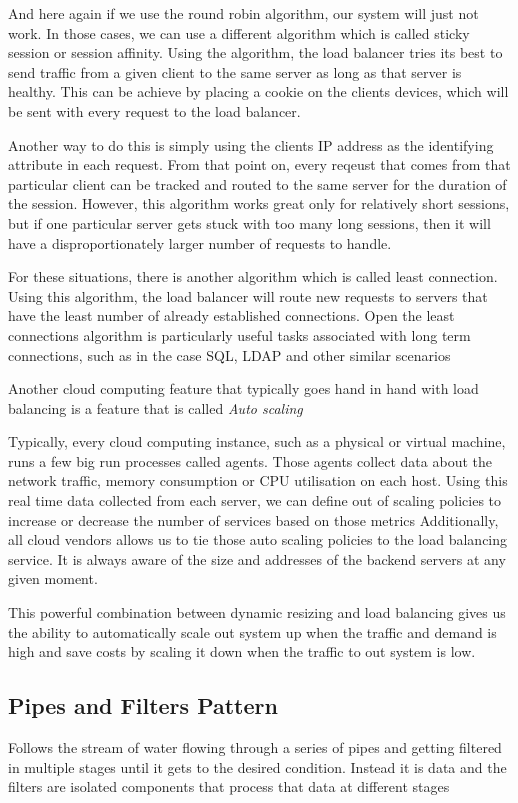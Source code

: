 And here again if we use the round robin algorithm, our system will just not work.
In those cases, we can use a different algorithm which is called sticky session or session affinity.
Using the algorithm, the load balancer tries its best to send traffic from a given client to the same server as long as that server is healthy.
This can be achieve by placing a cookie on the clients devices, which will be sent with every request to the load balancer.

Another way to do this is simply using the clients IP address as the identifying attribute in each request.
From that point on, every reqeust that comes from that particular client can be tracked and routed to the same server for the duration of the session.
However, this algorithm works great only for relatively short sessions, but if one particular server gets stuck with too many long sessions, then it will have a disproportionately larger number of requests to handle.

For these situations, there is another algorithm which is called least connection.
Using this algorithm, the load balancer will route new requests to servers that have the least number of already established connections.
Open the least connections algorithm is particularly useful tasks associated with long term connections, such as in the case SQL, LDAP and other similar scenarios

Another cloud computing feature that typically goes hand in hand with load balancing is a feature that is called \textit{Auto scaling}

Typically, every cloud computing instance, such as a physical or virtual machine, runs a few big run processes called agents.
Those agents collect data about the network traffic, memory consumption or CPU utilisation on each host.
Using this real time data collected from each server, we can define out of scaling policies to increase or decrease the number of services based on those metrics
Additionally, all cloud vendors allows us to tie those auto scaling policies to the load balancing service.
It is always aware of the size and addresses of the backend servers at any given moment.

This powerful combination between dynamic resizing and load balancing gives us the ability to automatically scale out system up when the traffic and demand is high and save costs by scaling it down when the traffic to out system is low.

\subsection{Pipes and Filters Pattern}
Follows the stream of water flowing through a series of pipes and getting filtered in multiple stages until it gets to the desired condition.
Instead it is data and the filters are isolated components that process that data at different stages

